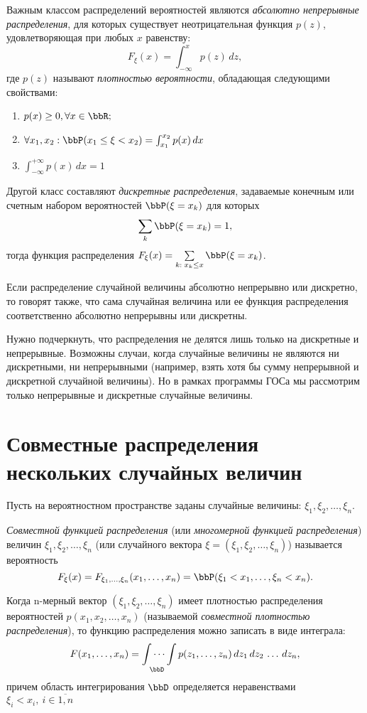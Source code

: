 Важным классом распределений вероятностей являются \textit{абсолютно непрерывные распределения}, для которых существует неотрицательная функция $p(z)$, удовлетворяющая при любых $x$ равенству:
$$F_\xi(x)=\int_{-\infty}^{x}p(z)\,dz,$$ где $p(z)$ называют \textit{плотностью вероятности}, обладающая следующими свойствами:
\begin{enumerate}
\item 
$p(x)\ge 0, \forall x \in \bbR;$ 
\item 
$\forall x_1,x_2: \bbP(x_1\le\xi<x_2)=\int_{x_1}^{x_2}p(x)\,dx$
\item
$\int_{-\infty}^{+\infty}p(x)\,dx=1$
\end{enumerate}

Другой класс составляют \textit{дискретные распределения}, задаваемые конечным или счетным набором вероятностей $\bbP(\xi = x_k)$ для которых
$$
\sum\limits_k \bbP(\xi=x_k)=1,
$$
тогда функция распределения $F_\xi(x)=\sum\limits_{k:\; x_k \le x} \bbP(\xi=x_k)$.

Если распределение случайной величины абсолютно непрерывно или дискретно, то говорят также, что сама случайная величина или ее функция распределения соответственно абсолютно непрерывны или дискретны.

Нужно подчеркнуть, что распределения не делятся лишь только на дискретные и непрерывные. Возможны случаи, когда случайные величины не являются ни дискретными, ни непрерывными (например, взять хотя бы сумму непрерывной и дискретной случайной величины). Но в рамках программы ГОСа мы рассмотрим только непрерывные и дискретные случайные величины. 

\section{Совместные распределения нескольких случайных величин}
Пусть на вероятностном пространстве заданы случайные величины: $\xi_1,\xi_2,\dots,\xi_n$.
\begin{defn}
\textit{Совместной функцией распределения} (или\textit{ многомерной функцией распределения}) величин $\xi_1,\xi_2,\dots,\xi_n$ (или случайного вектора $\xi = (\xi_1,\xi_2,\dots,\xi_n)$) называется вероятность 
$$
F_\xi(x)=F_{\xi_1,\dots,\xi_n}(x_1,\dots,x_n)=\bbP(\xi_1 < x_1,\dots,\xi_n<x_n).
$$
\end{defn}

Когда n-мерный вектор $(\xi_1,\xi_2,\dots,\xi_n)$ имеет плотностью распределения вероятностей $p(x_1,x_2,\dots,x_n)$ (называемой \textit{совместной плотностью распределения}), то функцию распределения можно записать в виде интеграла:
$$
F(x_1,\dots,x_n)=\idotsint\limits_\bbD p(z_1,\dots,z_n)\,dz_1\,dz_2\,\dots\,dz_n,
$$
причем область интегрирования $\bbD$ определяется неравенствами $\xi_i<x_i,\ i\in \overline{1,n}$

